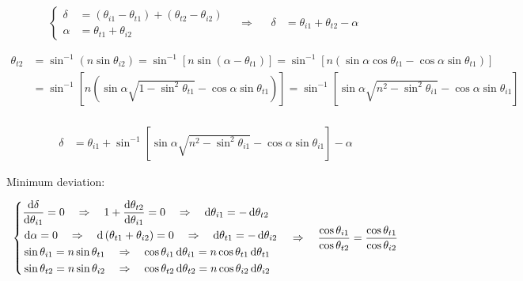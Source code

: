 \begin{equation*}
  \left\{
  \begin{aligned}
    \delta &= \left( \theta_{i1} - \theta_{t1} \right) + \left( \theta_{t2} - \theta_{i2} \right) \\
    \alpha &= \theta_{t1} + \theta_{i2}
  \end{aligned}
  \right.
  \quad \Rightarrow \quad 
  \begin{aligned}
    \delta &= \theta_{i1} + \theta_{t2} - \alpha
  \end{aligned}
\end{equation*}

\begin{equation*}
  \begin{aligned}
    \theta_{t2} &= \sin^{-1} \left( n \sin \theta_{i2} \right) 
    = \sin^{-1} \left[ n \sin \left( \alpha - \theta_{t1} \right) \right] 
    = \sin^{-1} \left[ n \left( \sin \alpha \cos \theta_{t1} - \cos \alpha \sin \theta_{t1} \right) \right] \\
    &= \sin^{-1} \left[ n \left( \sin \alpha \sqrt{1 - \sin^2 \theta_{t1}} - \cos \alpha \sin \theta_{t1} \right) \right] 
    = \sin^{-1} \left[ \sin \alpha \sqrt{n^2 - \sin^2 \theta_{i1}} - \cos \alpha \sin \theta_{i1} \right] \\
  \end{aligned}
\end{equation*}
  
\begin{equation*}
  \begin{aligned}
    \delta &= \theta_{i1} + \sin^{-1} \left[ \sin \alpha \sqrt{n^2 - \sin^2 \theta_{i1}} - \cos \alpha \sin \theta_{i1} \right] - \alpha
  \end{aligned}
\end{equation*}

Minimum deviation:

\begin{equation*}
  \left\{
  \begin{aligned}
    & \dfrac{\md \delta}{\md \theta_{i1}} = 0 \quad \Rightarrow \quad 1 + \dfrac{\md \theta_{t2}}{\md \theta_{i1}} = 0 \quad \Rightarrow \quad \md \theta_{i1} = - \md \theta_{t2} \\
    & \md \alpha = 0 \quad \Rightarrow \quad \md \left( \theta_{t1} + \theta_{i2} \right) = 0 \quad \Rightarrow \quad \md \theta_{t1} = - \md \theta_{i2} \\
    & \sin \theta_{i1} = n \sin \theta_{t1} \quad \Rightarrow \quad \cos \theta_{i1}\md \theta_{i1} = n \cos \theta_{t1} \md \theta_{t1} \\
    & \sin \theta_{t2} = n \sin \theta_{i2} \quad \Rightarrow \quad \cos \theta_{t2}\md \theta_{t2} = n \cos \theta_{i2} \md \theta_{i2}
  \end{aligned}
  \right.
  \quad \Rightarrow \quad 
  \begin{aligned}
    \dfrac{\cos \theta_{i1}}{\cos \theta_{t2}} = \dfrac{\cos \theta_{t1}}{\cos \theta_{i2}}  
  \end{aligned}
\end{equation*}

